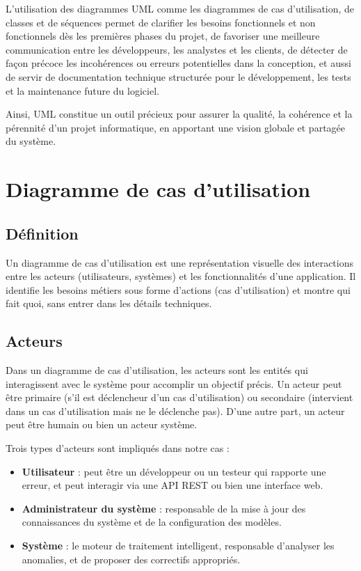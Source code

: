 \documentclass[12pt,a4paper]{report}
\begin{document}
	L’utilisation des diagrammes UML comme les diagrammes de cas d’utilisation, de classes et de séquences permet de clarifier les besoins fonctionnels et non fonctionnels dès les premières phases du projet, de favoriser une meilleure communication entre les développeurs, les analystes et les clients, de détecter de façon précoce les incohérences ou erreurs potentielles dans la conception, et aussi de servir de documentation technique structurée pour le développement, les tests et la maintenance future du logiciel.
	
	Ainsi, UML constitue un outil précieux pour assurer la qualité, la cohérence et la pérennité d’un projet informatique, en apportant une vision globale et partagée du système.
	
	\section{Diagramme de cas d'utilisation}
	
	\subsection{Définition}
	
	Un diagramme de cas d'utilisation est une représentation visuelle des interactions entre les acteurs (utilisateurs, systèmes) et les fonctionnalités d'une application. Il identifie les besoins métiers sous forme d'actions (cas d’utilisation) et montre qui fait quoi, sans entrer dans les détails techniques.
	
	\subsection{Acteurs}
	
	Dans un diagramme de cas d'utilisation, les acteurs sont les entités qui interagissent avec le système pour accomplir un objectif précis. Un acteur peut être primaire (s'il est déclencheur d'un cas d'utilisation) ou secondaire (intervient dans un cas d'utilisation mais ne le déclenche pas). D'une autre part, un acteur peut être humain ou bien un acteur système.
	
	Trois types d'acteurs sont impliqués dans notre cas :
	
	\begin{itemize}
		\item \textbf{Utilisateur} : peut être un développeur ou un testeur qui rapporte une erreur, et peut interagir via une API REST ou bien une interface web.
		
		\item \textbf{Administrateur du système} : responsable de la mise à jour des connaissances du système et de la configuration des modèles.
		
		\item \textbf{Système} : le moteur de traitement intelligent, responsable d'analyser les anomalies, et de proposer des correctifs appropriés.
	\end{itemize}
	
\end{document}
